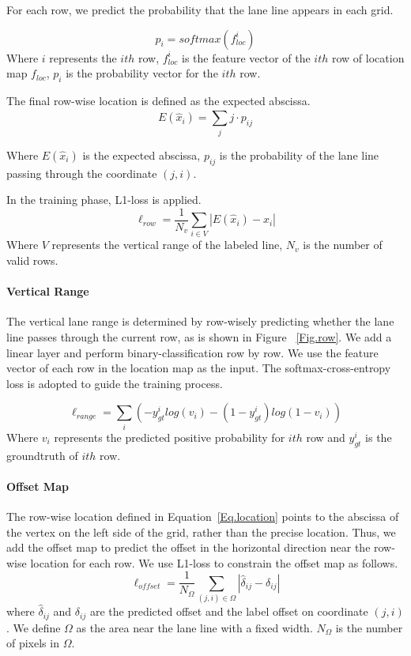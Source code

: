 \documentclass[10pt,twocolumn,letterpaper]{article}
\begin{document}
For each row, we predict the probability that the lane line appears in each grid.

\begin{equation}
    \displaystyle
    {p_i=softmax(f_{loc}^i)}
\end{equation}Where \(i\) represents the \(ith\) row, \(f_{loc}^i\) is the feature vector of the \(ith\) row of location map \(f_{loc}\), \(p_i\) is the probability vector for the \(ith\) row.

The final row-wise location is defined as the expected abscissa.
\begin{equation}
    \displaystyle
{E(\hat x_i)=\sum_{j}^{} j\cdot p_{ij}}
\label{Eq.location} \end{equation}


 Where \(E(\hat x_i)\) is the expected abscissa, \(p_{ij}\) is the probability of the lane line passing through the coordinate \((j, i)\).

In the training phase, L1-loss is applied.
\begin{equation}
    \displaystyle
\ell _{row} = \frac{1}{N_v}\sum_{i\in V}^{}  |E(\hat x_i)- x_i|
\end{equation}Where \(V\) represents the vertical range of the labeled line, \(N_v\) is the number of valid rows.

\paragraph{Vertical Range}
The vertical lane range is determined by row-wisely predicting whether the lane line passes through the current row, as is shown in Figure ~\ref{Fig.row}. We add a linear layer and perform binary-classification row by row. We use the feature vector of each row in the location map as the input. The softmax-cross-entropy loss is adopted to guide the training process.

\begin{equation}
\displaystyle
\ell _{range}=\sum_{i}^{}( -y_{gt}^ilog(v_i)-(1-y_{gt}^i)log(1-v_i))
\end{equation}Where \(v_i\) represents the predicted positive probability for \(ith\) row and \(y_{gt}^i\) is the groundtruth of \(ith\) row.

\paragraph{Offset Map}
The row-wise location defined in Equation~\ref{Eq.location} points to the abscissa of the vertex on the left side of the grid, rather than the precise location. Thus, we add the offset map to predict the offset in the horizontal direction near the row-wise location for each row. We use L1-loss to constrain the offset map as follows.
\begin{equation}
    \displaystyle
    \ell_{offset}=\frac{1}{N_{\Omega}} \sum_{(j,i)\in \Omega }^{} \left | \hat{\delta}_{ij} - \delta_{ij}  \right | 
\end{equation}where \(\hat{\delta}_{ij}\) and \(\delta_{ij}\) are the predicted offset and the label offset on coordinate \((j,i)\). We define \(\Omega\) as the area near the lane line with a fixed width. \(N_{\Omega}\) is the number of pixels in \(\Omega\).
\end{document}

